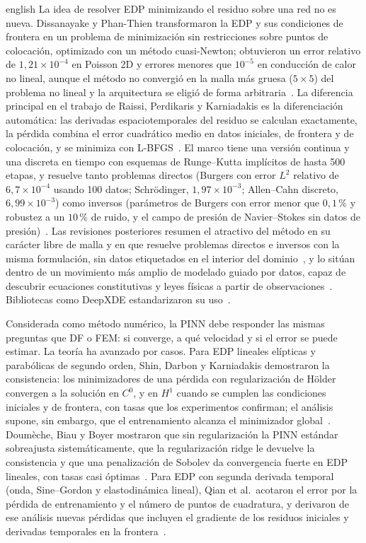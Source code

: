 \documentclass[../0000.tex]{subfiles}
\begin{document}
\begin{hyphenrules}{english}
La idea de resolver EDP minimizando el residuo sobre una red no es nueva. Dissanayake y Phan-Thien transformaron la EDP y sus condiciones de frontera en un problema de minimización sin restricciones sobre puntos de colocación, optimizado con un método cuasi-Newton; obtuvieron un error relativo de $1{,}21\times10^{-4}$ en Poisson 2D y errores menores que $10^{-5}$ en conducción de calor no lineal, aunque el método no convergió en la malla más gruesa ($5\times5$) del problema no lineal y la arquitectura se eligió de forma arbitraria~\cite{dissanayake1994neural}. La diferencia principal en el trabajo de Raissi, Perdikaris y Karniadakis es la diferenciación automática: las derivadas espaciotemporales del residuo se calculan exactamente, la pérdida combina el error cuadrático medio en datos iniciales, de frontera y de colocación, y se minimiza con L-BFGS~\cite{raissi2017physics,raissi2019physics}. El marco tiene una versión continua y una discreta en tiempo con esquemas de Runge--Kutta implícitos de hasta 500 etapas, y resuelve tanto problemas directos (Burgers con error $L^2$ relativo de $6{,}7\times10^{-4}$ usando 100 datos; Schrödinger, $1{,}97\times10^{-3}$; Allen--Cahn discreto, $6{,}99\times10^{-3}$) como inversos (parámetros de Burgers con error menor que $0{,}1\,\%$ y robustez a un $10\,\%$ de ruido, y el campo de presión de Navier--Stokes sin datos de presión)~\cite{raissi2017physics,raissi2017physicsII,raissi2019physics}. Las revisiones posteriores resumen el atractivo del método en su carácter libre de malla y en que resuelve problemas directos e inversos con la misma formulación, sin datos etiquetados en el interior del dominio~\cite{cuomo2022scientific,luo2025physics}, y lo sitúan dentro de un movimiento más amplio de modelado guiado por datos, capaz de descubrir ecuaciones constitutivas y leyes físicas a partir de observaciones~\cite{montans2019data}. Bibliotecas como DeepXDE estandarizaron su uso~\cite{lu2021deepxde}.

Considerada como método numérico, la PINN debe responder las mismas preguntas que DF o FEM: si converge, a qué velocidad y si el error se puede estimar. La teoría ha avanzado por casos. Para EDP lineales elípticas y parabólicas de segundo orden, Shin, Darbon y Karniadakis demostraron la consistencia: los minimizadores de una pérdida con regularización de Hölder convergen a la solución en $C^0$, y en $H^1$ cuando se cumplen las condiciones iniciales y de frontera, con tasas que los experimentos confirman; el análisis supone, sin embargo, que el entrenamiento alcanza el minimizador global~\cite{shin2020convergence}. Doumèche, Biau y Boyer mostraron que sin regularización la PINN estándar sobreajusta sistemáticamente, que la regularización ridge le devuelve la consistencia y que una penalización de Sobolev da convergencia fuerte en EDP lineales, con tasas casi óptimas~\cite{doumeche2025convergence}. Para EDP con segunda derivada temporal (onda, Sine--Gordon y elastodinámica lineal), Qian et al.\ acotaron el error por la pérdida de entrenamiento y el número de puntos de cuadratura, y derivaron de ese análisis nuevas pérdidas que incluyen el gradiente de los residuos iniciales y derivadas temporales en la frontera~\cite{qian2023error}.


\end{hyphenrules}
\end{document}
